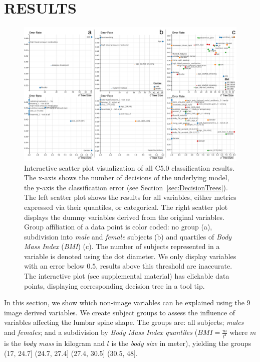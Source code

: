 \documentclass[a4paper,twoside]{style/article}
\begin{document}
\section{\uppercase{Results}}
\begin{figure}[!t]
  \centering
  \includegraphics[width=1\textwidth]{figures/results}
  \caption{
Interactive scatter plot visualization of all C5.0 classification results.
The x-axis shows the number of decisions of the underlying model, the y-axis the classification error (see Section~\ref{sec:DecisionTrees}).
The left scatter plot shows the results for all variables, either metrics expressed via their quantiles, or categorical.
The right scatter plot displays the dummy variables derived from the original variables.
Group affiliation of a data point is color coded:
no group (a), subdivision into \emph{male} and \emph{female} subjects (b) and quartiles of \emph{Body Mass Index} (\emph{BMI}) (c). %
The number of subjects represented in a variable is denoted using the dot diameter.
We only display variables with an error below $0.5$, results above this threshold are inaccurate.
The interactive plot (see supplemental material) has clickable data points, displaying corresponding decision tree in a tool tip.
}
  \label{fig:results}
\end{figure}
\noindent In this section, we show which non-image variables can be explained using the 9 image derived variables.
We create subject groups to assess the influence of variables affecting the lumbar spine shape.
The groups are: all subjects; \emph{males} and \emph{females}; and a subdivision by \emph{Body Mass Index quantiles} ($BMI = \frac{m}{l^2}$ where $m$ is the \emph{body mass} in kilogram and $l$ is the \emph{body size} in meter), yielding the groups (17, 24.7] (24.7, 27.4] (27.4, 30.5] (30.5, 48].
\end{document}
